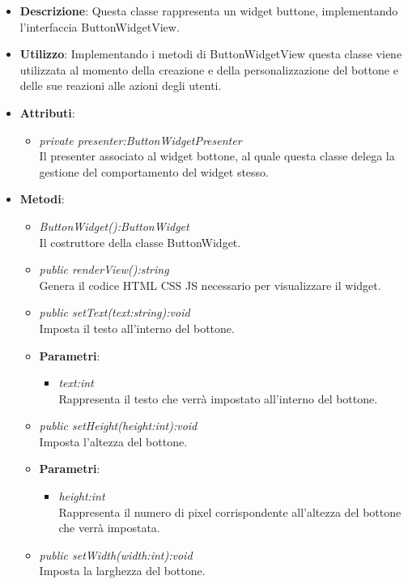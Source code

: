 \begin{itemize}
\item \textbf{Descrizione}: Questa classe rappresenta un widget buttone, implementando l'interfaccia ButtonWidgetView.
\item \textbf{Utilizzo}: Implementando i metodi di ButtonWidgetView questa classe viene utilizzata al momento della creazione e della personalizzazione del bottone e delle sue reazioni alle azioni degli utenti.
\item \textbf{Attributi}: 
	\begin{itemize}
	\item \textit{private presenter:ButtonWidgetPresenter}\\
	Il presenter associato al widget bottone, al quale questa classe delega la gestione del comportamento del widget stesso.
	\end{itemize}
\item \textbf{Metodi}:
	\begin{itemize}
	\item \textit{ButtonWidget():ButtonWidget}\\
	Il costruttore della classe ButtonWidget.
	\item \textit{public renderView():string}\\
	 Genera il codice HTML CSS JS necessario per visualizzare il widget.
	\item \textit{public setText(text:string):void}\\
	Imposta il testo all'interno del bottone.
		\item{\textbf{Parametri}: \begin{itemize}
		\item \textit{text:int}\\
		Rappresenta il testo che verrà impostato all'interno del bottone.
		\end{itemize}}
	\item \textit{public setHeight(height:int):void}\\
	Imposta l'altezza del bottone.
		\item{\textbf{Parametri}: \begin{itemize}
		\item \textit{height:int}\\
		Rappresenta il numero di pixel corrispondente all'altezza del bottone che verrà impostata.
		\end{itemize}}
	\item \textit{public setWidth(width:int):void}\\
	Imposta la larghezza del bottone.

\end{itemize}
\end{itemize}
